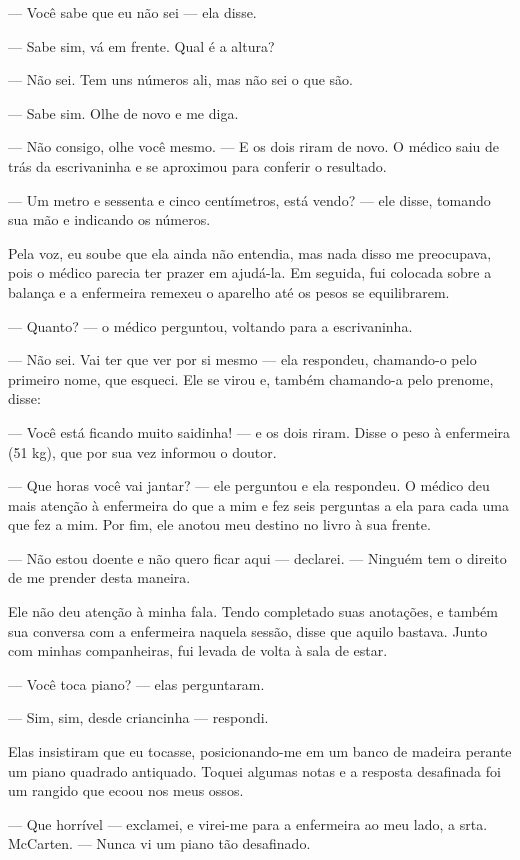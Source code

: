 --- Você sabe que eu não sei --- ela disse.

--- Sabe sim, vá em frente. Qual é a altura?

--- Não sei. Tem uns números ali, mas não sei o que são.

--- Sabe sim. Olhe de novo e me diga.

--- Não consigo, olhe você mesmo. --- E os dois riram de novo. O médico
saiu de trás da escrivaninha e se aproximou para conferir o resultado.

--- Um metro e sessenta e cinco centímetros, está vendo? --- ele disse,
tomando sua mão e indicando os números.

Pela voz, eu soube que ela ainda não entendia, mas nada disso me
preocupava, pois o médico parecia ter prazer em ajudá-la. Em seguida,
fui colocada sobre a balança e a enfermeira remexeu o aparelho até os
pesos se equilibrarem.

--- Quanto? --- o médico perguntou, voltando para a escrivaninha.

--- Não sei. Vai ter que ver por si mesmo --- ela respondeu, chamando-o
pelo primeiro nome, que esqueci. Ele se virou e, também chamando-a
pelo prenome, disse:

--- Você está ficando muito saidinha! --- e os dois riram. Disse o
peso à enfermeira (51 kg), que por sua vez informou o doutor.

--- Que horas você vai jantar? --- ele perguntou e ela respondeu. O
médico deu mais atenção à enfermeira do que a mim e fez seis perguntas a
ela para cada uma que fez a mim. Por fim, ele anotou meu destino no
livro à sua frente. 

--- Não estou doente e não quero ficar aqui ---
declarei. --- Ninguém tem o direito de me prender desta maneira. 

Ele não deu atenção à minha fala. Tendo completado suas anotações, e também
sua conversa com a enfermeira naquela sessão, disse que aquilo bastava.
Junto com minhas companheiras, fui levada de volta à sala de estar.

--- Você toca piano? --- elas perguntaram.

--- Sim, sim, desde criancinha --- respondi.

Elas insistiram que eu tocasse, posicionando-me em um banco de madeira
perante um piano quadrado antiquado. Toquei algumas notas e a resposta
desafinada foi um rangido que ecoou nos meus ossos.

--- Que horrível --- exclamei, e virei-me para a enfermeira ao meu lado,
a srta. McCarten. --- Nunca vi um piano tão desafinado.

